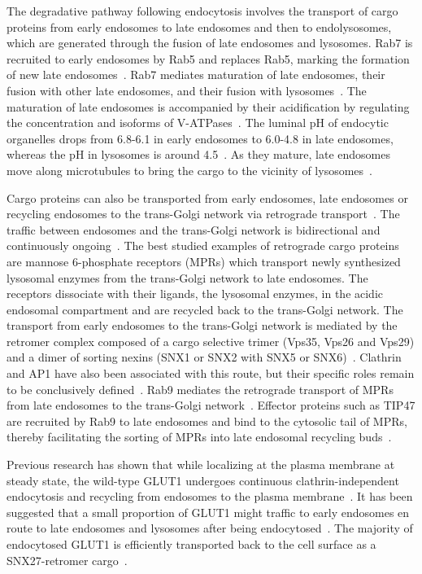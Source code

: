 The degradative pathway following endocytosis involves the transport of cargo proteins from early endosomes to late endosomes and then to endolysosomes, which are generated through the fusion of late endosomes and lysosomes. Rab7 is recruited to early endosomes by Rab5 and replaces Rab5, marking the formation of new late endosomes~\cite{Huotari}. Rab7 mediates maturation of late endosomes, their fusion with other late endosomes, and their fusion with lysosomes~\cite{Stenmark}. The maturation of late endosomes is accompanied by their acidification by regulating the concentration and isoforms of V-ATPases~\cite{Huotari}. The luminal pH of endocytic organelles drops from 6.8-6.1 in early endosomes to 6.0-4.8 in late endosomes, whereas the pH in lysosomes is around 4.5~\cite{Maxfield}. As they mature, late endosomes move along microtubules to bring the cargo to the vicinity of lysosomes~\cite{Huotari}.

Cargo proteins can also be transported from early endosomes, late endosomes or recycling endosomes to the trans-Golgi network via retrograde transport~\cite{Huotari,Johannes}. The traffic between endosomes and the trans-Golgi network is bidirectional and continuously ongoing~\cite{Huotari}. The best studied examples of retrograde cargo proteins are mannose 6-phosphate receptors (MPRs) which transport newly synthesized lysosomal enzymes from the trans-Golgi network to late endosomes. The receptors dissociate with their ligands, the lysosomal enzymes, in the acidic endosomal compartment and are recycled back to the trans-Golgi network. The transport from early endosomes to the trans-Golgi network is mediated by the retromer complex composed of a cargo selective trimer (Vps35, Vps26 and Vps29) and a dimer of sorting nexins (SNX1 or SNX2 with SNX5 or SNX6)~\cite{Johannes,Seaman}. Clathrin and AP1 have also been associated with this route, but their specific roles remain to be conclusively defined~\cite{Seaman}. Rab9 mediates the retrograde transport of MPRs from late endosomes to the trans-Golgi network~\cite{Stenmark}. Effector proteins such as TIP47 are recruited by Rab9 to late endosomes and bind to the cytosolic tail of MPRs, thereby facilitating the sorting of MPRs into late endosomal recycling buds~\cite{Stenmark}. 

Previous research has shown that while localizing at the plasma membrane at steady state, the wild-type GLUT1 undergoes continuous clathrin-independent endocytosis and recycling from endosomes to the plasma membrane~\cite{Eyster,McGough}. It has been suggested that a small proportion of GLUT1 might traffic to early endosomes en route to late endosomes and lysosomes after being endocytosed~\cite{Eyster,McGough}. The majority of endocytosed GLUT1 is efficiently transported back to the cell surface as a SNX27-retromer cargo~\cite{Steinberg}.
\newcommand{\keyword}[1]{\textbf{#1}}
\newcommand{\tabhead}[1]{\textbf{#1}}
\newcommand{\code}[1]{\texttt{#1}}
\newcommand{\file}[1]{\texttt{\bfseries#1}}
\newcommand{\option}[1]{\texttt{\itshape#1}}

